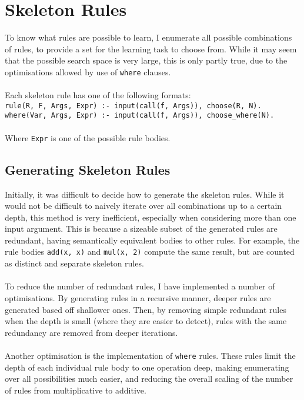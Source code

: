 \section{Skeleton Rules}
To know what rules are possible to learn, I enumerate all possible combinations of rules, to provide a set for the learning task to choose from. While it may seem that the possible search space is very large, this is only partly true, due to the optimisations allowed by use of \lstinline{where} clauses. \\ \\ %
Each skeleton rule has one of the following formats: \\

\lstinline{rule(R, F, Args, Expr) :- input(call(f, Args)), choose(R, N).} %
\mbox{} \\

\lstinline{where(Var, Args, Expr) :- input(call(f, Args)), choose_where(N).} %
\mbox{} \\ \\
Where \lstinline{Expr} is one of the possible rule bodies. %

\subsection{Generating Skeleton Rules}
Initially, it was difficult to decide how to generate the skeleton rules. While it would not be difficult to naively iterate over all combinations up to a certain depth, this method is very inefficient, especially when considering more than one input argument. This is because a sizeable subset of the generated rules are redundant, having semantically equivalent bodies to other rules. For example, the rule bodies \lstinline{add(x, x)} and \lstinline{mul(x, 2)} compute the same result, but are counted as distinct and separate skeleton rules.\\ \\
To reduce the number of redundant rules, I have implemented a number of optimisations. By generating rules in a recursive manner, deeper rules are generated based off shallower ones. Then, by removing simple redundant rules when the depth is small (where they are easier to detect), rules with the same redundancy are removed from deeper iterations. \\ \\
Another optimisation is the implementation of \lstinline{where} rules. These rules limit the depth of each individual rule body to one operation deep, making enumerating over all possibilities much easier, and reducing the overall scaling of the number of rules from multiplicative to additive. %

